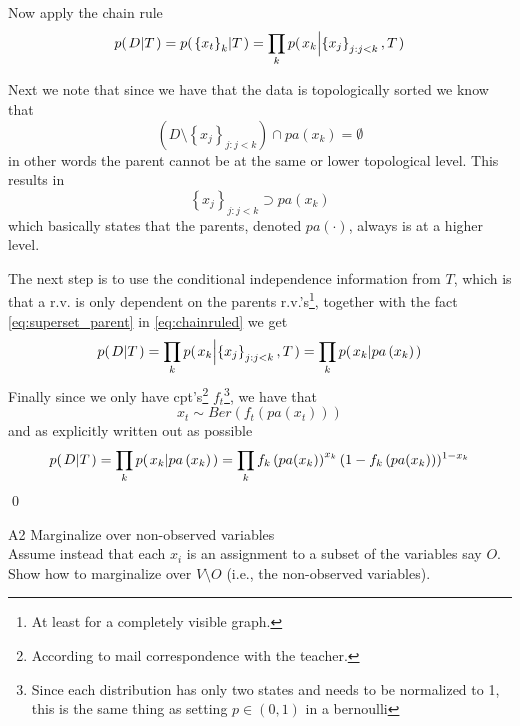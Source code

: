 \documentclass[a4paper,twoside=false,abstract=false,numbers=noenddot,
titlepage=false,headings=small,parskip=half,version=last]{scrartcl}
\begin{document}
\begin{solution}
    Now apply the chain rule
    \begin{equation}
        \label{eq:chainruled}
        p{(\left. D \middle\vert T \right.)} = p{(\left. \left\{x_t\right\}_{k} \middle\vert T \right.)} = 
        \prod_kp{(\left. x_k \middle\vert \left\{x_j\right\}_{j:j<k},T \right.)}
    \end{equation}

    Next we note that since we have that the data is topologically sorted
    we know that
    \begin{equation}
        \left(D \setminus \left\{x_j\right\}_{j:j<k}\right) \cap
        pa\left(x_k\right) = \emptyset
    \end{equation}
    in other words the parent cannot be at the same or lower topological level.
    This results in 
    \begin{equation}
        \label{eq:superset_parent}
        \left\{x_j\right\}_{j:j<k} \supset pa\left(x_k\right)
    \end{equation}
    which basically states that the parents, denoted 
    $pa(\cdot)$, always is at a higher level.
    
    The next step is to use the conditional independence information from $T$,
    which is that a r.v. is only dependent on the parents r.v.'s\footnote{At
    least for a completely visible graph.}, together with the fact
    \eqref{eq:superset_parent} in \eqref{eq:chainruled} we get 
    \begin{equation}
        p{(\left. D \middle\vert T \right.)} 
        =\prod_kp{(\left. x_k \middle\vert \left\{x_j\right\}_{j:j<k},T \right.)}
        =\prod_kp{(\left. x_k \middle\vert pa\left(x_k\right) \right.)}
    \end{equation}
    Finally since we only have cpt's\footnote{According to mail correspondence with
    the teacher.} $f_t$\footnote{Since each distribution has only two states
    and needs to be normalized
    to 1, this is the same thing as setting $p\in\left(0,1\right)$ in a
    bernoulli}, we have that
    \begin{equation}
        x_t \sim Ber\left(f_t(pa(x_t))\right) 
    \end{equation}
    and as explicitly written out as possible
    \begin{equation}
        p{(\left. D \middle\vert T \right.)}
        =\prod_kp{(\left. x_k \middle\vert pa\left(x_k\right) \right.)}
        =\prod_k
        f_k\left(pa(x_k)\right)^{x_k}(1-f_k\left(pa(x_k)\right))^{1-x_k}
    \end{equation}
    \qed
\end{solution}

\begin{exercise}{A2} Marginalize over non-observed variables \\
    Assume instead that each $x_i$ is an assignment to a subset of the
    variables say $O$.
    Show how to marginalize over $V\setminus O$ (i.e., the non-observed
    variables).
\end{exercise}
\begin{solution}

\end{solution}
\end{document}
